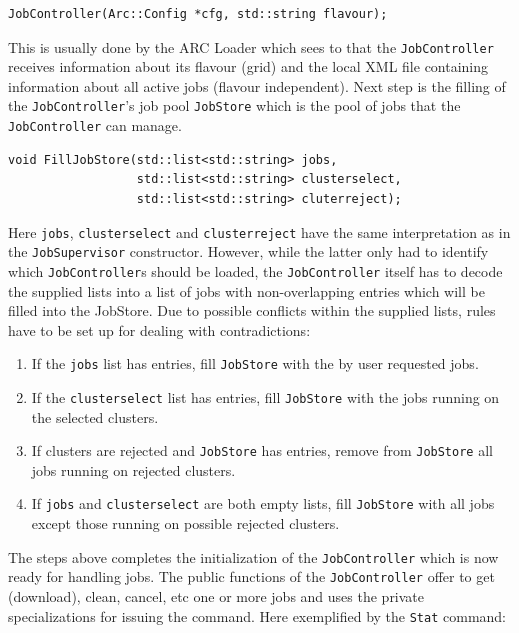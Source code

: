 \documentclass{book}
\newcommand{\JobSupervisor}{\texttt{JobSupervisor}}
\newcommand{\JobController}{\texttt{JobController}}
\begin{document}
\begin{shaded}
\begin{verbatim}
JobController(Arc::Config *cfg, std::string flavour);
\end{verbatim}
\end{shaded}

This is usually done by the ARC Loader which sees to that the {\JobController} receives information about its flavour (grid) and 
the local XML file containing information about all active jobs (flavour independent). Next step is the filling of the {\JobController}'s
job pool \texttt{JobStore} which is the pool of jobs that the {\JobController} can manage.

\begin{shaded}
\begin{verbatim}
void FillJobStore(std::list<std::string> jobs,
                  std::list<std::string> clusterselect,
                  std::list<std::string> cluterreject);
\end{verbatim}
\end{shaded}

Here \texttt{jobs}, \texttt{clusterselect} and \texttt{clusterreject} have the same interpretation as in the {\JobSupervisor} constructor. 
However, while the latter only had to identify which {\JobController}s should be loaded, the {\JobController} itself has to decode the 
supplied lists into a list of jobs with non-overlapping entries which will be filled into the JobStore. Due to possible conflicts 
within the supplied lists, rules have to be set up for dealing with contradictions:

\begin{enumerate}
\item{If the \texttt{jobs} list has entries, fill \texttt{JobStore} with the by user requested jobs.}
\item{If the \texttt{clusterselect} list has entries, fill \texttt{JobStore} with the jobs running on the selected clusters.}
\item{If clusters are rejected and \texttt{JobStore} has entries, remove from \texttt{JobStore} all jobs running on rejected clusters.}
\item{If \texttt{jobs} and \texttt{clusterselect} are both empty lists, fill \texttt{JobStore} with all jobs except those 
running on possible rejected clusters.}
\end{enumerate}

The steps above completes the initialization of the {\JobController} which is now ready for handling jobs. The public functions of the 
{\JobController} offer to get (download), clean, cancel, etc one or more jobs and uses the private specializations for issuing the command. 
Here exemplified by the \texttt{Stat} command:
\end{document}
